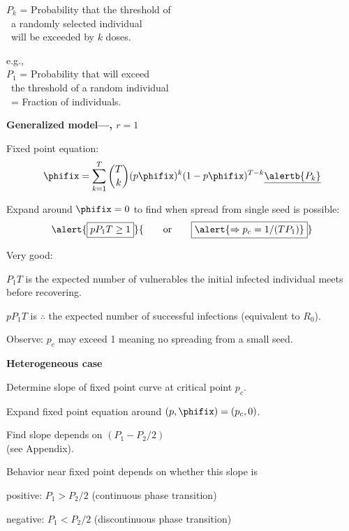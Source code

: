     $P_k$ = Probability that the threshold of \\
    \quad \quad \  a randomly selected individual\\
    \quad \quad \  will be exceeded by $k$ doses.
  
    e.g., \\
    $P_1$ = Probability that \underline{} will exceed\\
    \quad \quad \ the threshold of a random individual\\
    \ \quad  = Fraction of \underline{} individuals.
  


  \textbf{Generalized model---, $r=1$}

  
  
    Fixed point equation:
    $$
    \phifix
    =
    \sum_{k=1}^{T}
    \binom{T}{k}
    (p\phifix)^{k}
    (1-p\phifix)^{T-k}
    \underline{\alertb{P_k}}
    $$
   
    Expand around $\phifix=0$ to find
    when spread from single seed is possible:
    $$\alert{\boxed{p P_1 T \ge 1}}
    {\qquad \mbox{or} \qquad
      \boxed{\alert{\Rightarrow p_c = 1/(TP_1)}}
    }
    $$
  
    Very good:
    
     
      $P_1T$ is the expected number of vulnerables the
      initial infected individual meets before recovering.
     
      $pP_1T$ is $\therefore$ the expected number of
      successful infections (equivalent to $R_0$).
    
  
    Observe: $p_c$ may exceed 1 meaning no spreading from
    a small seed.
  


  \textbf{Heterogeneous case}

  
  
     Determine slope of fixed point curve at 
    critical point $p_c$.
  
    Expand fixed point equation around $(p,\phifix) = (p_c,0)$.
  
    Find slope depends on $(P_1 - P_2/2)$\cite{dodds2005a}\\
    (see Appendix).
  
    Behavior near fixed point depends on whether
    this slope is
    
    
      positive: $P_1>P_2/2$ (continuous phase transition)
    
      negative: $P_1<P_2/2$ (discontinuous phase transition)
    
